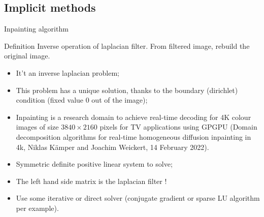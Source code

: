 \documentclass[compress,10pt,aspectratio=169]{beamer}
\begin{document}
\subsection{Implicit methods}

\begin{frame}[fragile]{Inpainting algorithm}
  \scriptsize
  \begin{block}{\small Definition}
    Inverse operation of laplacian filter. From filtered image, rebuild the original image.

    \begin{itemize}
    \item It't an inverse laplacian problem;
    \item This problem has a unique solution, thanks to the boundary (dirichlet) condition (fixed value 0 out of the image);
    \item Inpainting is a research domain to achieve real-time decoding for 4K colour images of size $3840\times 2160$ pixels for TV applications using GPGPU (Domain decomposition algorithms for real-time homogeneous diffusion inpainting in 4k, Niklas Kämper and Joachim Weickert, 14 February 2022).
    \item Symmetric definite positive linear system to solve;
    \item The left hand side matrix is the laplacian filter !
    \item Use some iterative or direct solver (conjugate gradient or sparse LU algorithm per example).
    \end{itemize}
  \end{block}
\end{frame}
\end{document}
